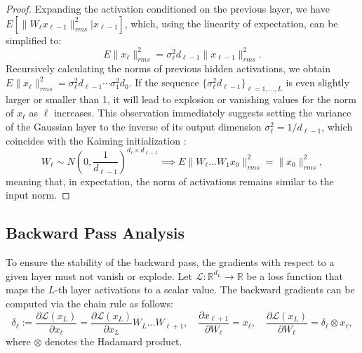 \begin{proof}
Expanding the activation conditioned on the previous layer, we have \( E[\|W_\ell x_{\ell-1}\|_{rms}^2 | x_{\ell-1}] \), which, using the linearity of expectation, can be simplified to:
\begin{equation}
E \|x_\ell\|_{rms}^2 = \sigma_\ell^2 d_{\ell-1} \|x_{\ell-1}\|_{rms}^2.
\end{equation}
Recursively calculating the norms of previous hidden activations, we obtain \( E \|x_\ell\|_{rms}^2 = \sigma_\ell^2 d_{\ell-1} \cdots \sigma_1^2 d_0 \). If the sequence \( \{\sigma_\ell^2 d_{\ell-1}\}_{\ell=1,\dots,L} \) is even slightly larger or smaller than 1, it will lead to explosion or vanishing values for the norm of \( x_\ell \) as \( \ell \) increases. This observation immediately suggests setting the variance of the Gaussian layer to the inverse of its output dimension \( \sigma_\ell^2 = 1/d_{\ell-1} \), which coincides with the Kaiming initialization \cite{he2015delving}:
\begin{equation}
W_\ell \sim N\left(0, \frac{1}{d_{\ell-1}}\right)^{d_\ell \times d_{\ell-1}} \implies E \|W_\ell \dots W_1 x_0 \|_{rms}^2 = \|x_0\|_{rms}^2,
\end{equation}
meaning that, in expectation, the norm of activations remains similar to the input norm.
\end{proof}

\subsection{Backward Pass Analysis}

\begin{theorem}
To ensure the stability of the backward pass, the gradients with respect to a given layer must not vanish or explode. Let \( \mathcal{L}: \mathbb{R}^{d_L} \to \mathbb{R} \) be a loss function that maps the \( L \)-th layer activations to a scalar value. The backward gradients can be computed via the chain rule as follows:
\begin{equation}
\delta_\ell := \frac{\partial \mathcal{L}(x_L)}{\partial x_\ell } = \frac{\partial \mathcal{L}(x_L)}{\partial x_L} W_L \dots W_{\ell+1}, \quad
\frac{\partial x_{\ell+1}}{\partial W_\ell} = x_\ell, \quad
\frac{\partial \mathcal{L}(x_L)}{\partial W_\ell} = \delta_\ell \otimes x_\ell,
\end{equation}
where \( \otimes \) denotes the Hadamard product.
\end{theorem}

